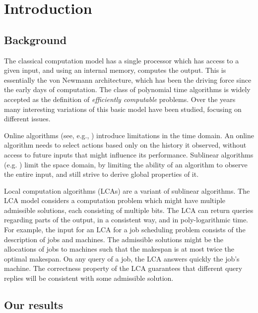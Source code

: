 \documentclass[english, oribibl]{llncs}
\begin{document}
\section{Introduction}
\label{section:introduction}

\subsection{Background}
The classical computation model has a single processor which has
access to a given input, and using an internal memory, computes the
output. This is essentially the von Newmann architecture, which has
been the driving force since the early days of computation.
The class of polynomial time algorithms is widely accepted as the
definition of {\em efficiently computable} problems.
Over the years many interesting variations of this basic model have
been studied, focusing on different issues.




Online algorithms (see, e.g., \cite{BEY98}) introduce limitations in the time domain. An online
algorithm needs to select actions based only on the history it
observed, without access to future inputs that might influence its
performance. Sublinear algorithms (e.g. \cite{MR06, PR07}) limit the space domain, by
limiting the ability of an algorithm to observe the entire input,
and still strive to derive global properties of it.

Local computation algorithms (LCAs) \cite{RTVX11} are a variant of
sublinear algorithms.
The LCA model considers a computation problem which might have
multiple admissible solutions,  each consisting of multiple bits. The
LCA can return queries regarding parts of the output, in a consistent
way, and in poly-logarithmic time. For example, the input for an LCA
for a job scheduling problem consists of the description of  jobs
and  machines. The admissible solutions might be the allocations
of jobs to machines such that the makespan is at most twice the optimal
makespan. On any query of a job, the LCA answers quickly the job's machine.
The correctness property of the LCA guarantees that different query
replies will be consistent with some admissible solution.









\subsection{Our results}
\end{document}
